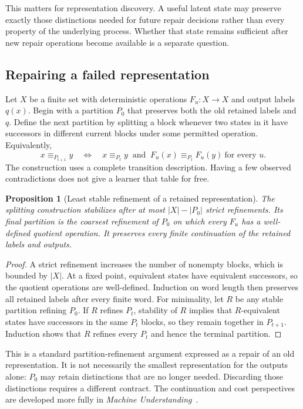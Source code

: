 \documentclass[11pt,letterpaper]{article}
\theoremstyle{plain}
\newtheorem{proposition}[theorem]{Proposition}
\theoremstyle{definition}
\begin{document}
This matters for representation discovery. A useful latent state may preserve exactly those distinctions needed for future repair decisions rather than every property of the underlying process. Whether that state remains sufficient after new repair operations become available is a separate question.

\subsection{Repairing a failed representation}
Let $X$ be a finite set with deterministic operations $F_u:X\to X$ and output labels $q(x)$. Begin with a partition $P_0$ that preserves both the old retained labels and $q$. Define the next partition by splitting a block whenever two states in it have successors in different current blocks under some permitted operation. Equivalently,
\[
x\equiv_{P_{t+1}}y
\quad\Longleftrightarrow\quad
x\equiv_{P_t}y\ \text{ and }\
F_u(x)\equiv_{P_t}F_u(y)\ \text{for every }u.
\]
The construction uses a complete transition description. Having a few observed contradictions does not give a learner that table for free.

\begin{proposition}[Least stable refinement of a retained representation]\label{prop:refinement}
The splitting construction stabilizes after at most $|X|-|P_0|$ strict refinements. Its final partition is the coarsest refinement of $P_0$ on which every $F_u$ has a well-defined quotient operation. It preserves every finite continuation of the retained labels and outputs.
\end{proposition}
\begin{proof}
A strict refinement increases the number of nonempty blocks, which is bounded by $|X|$. At a fixed point, equivalent states have equivalent successors, so the quotient operations are well-defined. Induction on word length then preserves all retained labels after every finite word. For minimality, let $R$ be any stable partition refining $P_0$. If $R$ refines $P_t$, stability of $R$ implies that $R$-equivalent states have successors in the same $P_t$ blocks, so they remain together in $P_{t+1}$. Induction shows that $R$ refines every $P_t$ and hence the terminal partition.
\end{proof}

This is a standard partition-refinement argument expressed as a repair of an old representation. It is not necessarily the smallest representation for the outputs alone: $P_0$ may retain distinctions that are no longer needed. Discarding those distinctions requires a different contract. The continuation and cost perspectives are developed more fully in \emph{Machine Understanding}~\cite{understanding}.
\end{document}
